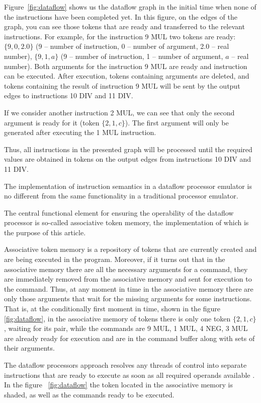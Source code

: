 \documentclass[
11pt,%
tightenlines,%
twoside,%
onecolumn,%
nofloats,%
nobibnotes,%
nofootinbib,%
superscriptaddress,%
noshowpacs,%
centertags]%
{revtex4}
\begin{document}
Figure~\ref{fig:dataflow} shows us the dataflow graph in the initial time when none of the instructions have been completed yet.
In this figure, on the edges of the graph, you can see those tokens that are ready and transferred to the relevant instructions.
For example, for the instruction 9 MUL two tokens are ready: $\{9, 0, 2.0\}$ (9 -- number of instruction, 0 -- number of argument, 2.0 -- real number), $\{9, 1, a\}$ (9 -- number of instruction, 1 -- number of argument, $a$ -- real number).
Both arguments for the instruction 9 MUL are ready and instruction can be executed.
After execution, tokens containing arguments are deleted, and tokens containing the result of instruction 9 MUL will be sent by the output edges to instructions 10 DIV and 11 DIV.

If we consider another instruction 2 MUL, we can see that only the second argument is ready for it (token $\{2, 1, c\}$).
The first argument will only be generated after executing the 1 MUL instruction.

Thus, all instructions in the presented graph will be processed until the required values are obtained in tokens on the output edges from instructions 10 DIV and 11 DIV.

The implementation of instruction semantics in a dataflow processor emulator is no different from the same functionality in a traditional processor emulator.

The central functional element for ensuring the operability of the dataflow processor is so-called associative token memory, the implementation of which is the purpose of this article.

Associative token memory is a repository of tokens that are currently created and are being executed in the program.
Moreover, if it turns out that in the associative memory there are all the necessary arguments for a command, they are immediately removed from the associative memory and sent for execution to the command.
Thus, at any moment in time in the associative memory there are only those arguments that wait for the missing arguments for some instructions.
That is, at the conditionally first moment in time, shown in the figure~ \ref{fig:dataflow}, in the associative memory of tokens there is only one token $\{2, 1, c\}$, waiting for its pair, while the commands are 9 MUL, 1 MUL, 4 NEG, 3 MUL are already ready for execution and are in the command buffer along with sets of their arguments.

The dataflow processors approach resolves any threads of control into separate instructions that are ready to execute as soon as all required operands available \cite{silc}. 
In the figure ~\ref{fig:dataflow} the token located in the associative memory is shaded, as well as the commands ready to be executed.
\end{document}
